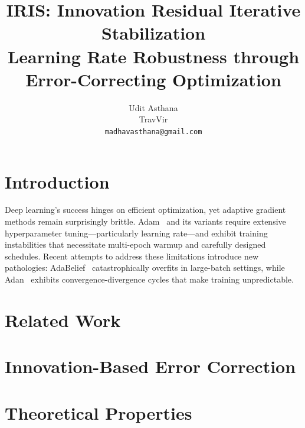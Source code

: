\documentclass[11pt]{article}
\title{\Large \textbf{IRIS: Innovation Residual Iterative Stabilization}\\
\large Learning Rate Robustness through Error-Correcting Optimization}
\author{
Udit Asthana \\
TravVir\\
\texttt{madhavasthana@gmail.com}
}
\begin{document}
\maketitle



\section{Introduction}
\label{sec:intro}

Deep learning's success hinges on efficient optimization, yet adaptive gradient methods remain surprisingly brittle. Adam~\citep{kingma2015adam} and its variants require extensive hyperparameter tuning---particularly learning rate---and exhibit training instabilities that necessitate multi-epoch warmup and carefully designed schedules. Recent attempts to address these limitations introduce new pathologies: AdaBelief~\citep{zhuang2020adabelief} catastrophically overfits in large-batch settings, while Adan~\citep{xie2022adan} exhibits convergence-divergence cycles that make training unpredictable.


\section{Related Work}
\label{sec:related}


\section{Innovation-Based Error Correction}
\label{sec:method}


\section{Theoretical Properties}
\label{sec:theory}

\end{document}
